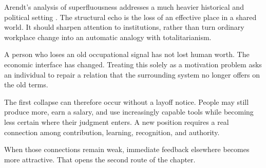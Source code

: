Arendt's analysis of superfluousness addresses a much heavier historical and political setting \cite{arendt1951origins}. The structural echo is the loss of an effective place in a shared world. It should sharpen attention to institutions, rather than turn ordinary workplace change into an automatic analogy with totalitarianism.

A person who loses an old occupational signal has not lost human worth. The economic interface has changed. Treating this solely as a motivation problem asks an individual to repair a relation that the surrounding system no longer offers on the old terms.

The first collapse can therefore occur without a layoff notice. People may still produce more, earn a salary, and use increasingly capable tools while becoming less certain where their judgment enters. A new position requires a real connection among contribution, learning, recognition, and authority.

When those connections remain weak, immediate feedback elsewhere becomes more attractive. That opens the second route of the chapter.
